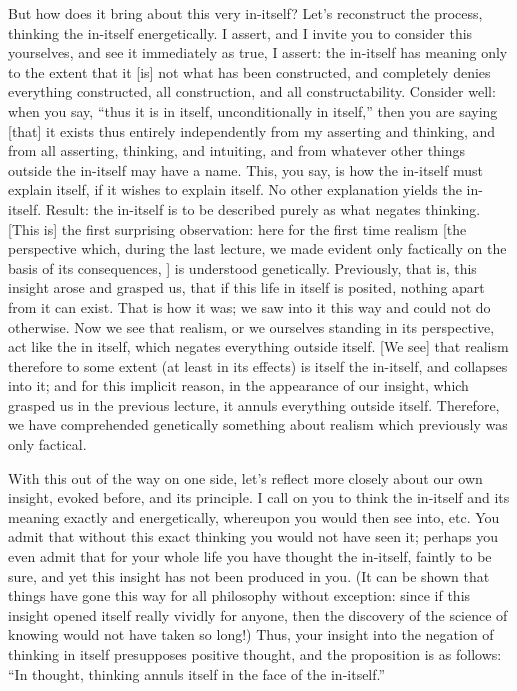 But how does it bring about this very in-itself?
Let's reconstruct the process,
thinking the in-itself energetically.
I assert, and I invite you to consider this yourselves,
and see it immediately as true, I assert:
the in-itself has meaning only to the extent
that it [is] not what has been constructed,
and completely denies everything constructed,
all construction, and all constructability.
Consider well: when you say,
“thus it is in itself, unconditionally in itself,”
then you are saying [that] it exists thus
entirely independently from my asserting and thinking,
and from all asserting, thinking, and intuiting,
and from whatever other things outside
the in-itself may have a name.
This, you say, is how the in-itself must explain itself,
if it wishes to explain itself.
No other explanation yields the in-itself.
Result: the in-itself is to be described purely
as what negates thinking.
[This is] the first surprising observation:
here for the first time realism
[the perspective which, during the last lecture,
we made evident only factically
on the basis of its consequences, ]
is understood genetically.
Previously, that is, this insight arose and grasped us,
that if this life in itself is posited,
nothing apart from it can exist.
That is how it was;
we saw into it this way
and could not do otherwise.
Now we see that realism,
or we ourselves standing in its perspective,
act like the in itself,
which negates everything outside itself.
[We see] that realism therefore to some extent
(at least in its effects) is itself the in-itself,
and collapses into it;
and for this implicit reason,
in the appearance of our insight,
which grasped us in the previous lecture,
it annuls everything outside itself.
Therefore, we have comprehended genetically
something about realism which previously was only factical.

With this out of the way on one side,
let's reflect more closely about our own insight,
evoked before, and its principle.
I call on you to think the in-itself
and its meaning exactly and energetically,
whereupon you would then see into, etc.
You admit that without this exact thinking
you would not have seen it;
perhaps you even admit that for your whole life
you have thought the in-itself, faintly to be sure,
and yet this insight has not been produced in you.
(It can be shown that things have gone this way
for all philosophy without exception:
since if this insight opened itself really vividly for anyone,
then the discovery of the science of knowing
would not have taken so long!)
Thus, your insight into the negation of thinking in itself
presupposes positive thought,
and the proposition is as follows:
“In thought, thinking annuls itself
in the face of the in-itself.”

